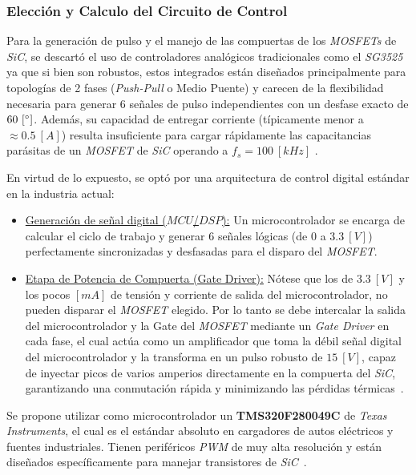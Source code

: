 \documentclass[12pt,a4paper]{article}
\begin{document}
\subsubsection{Elección y Calculo del Circuito de Control}                  \label{sec_2.3.1}
Para la generación de pulso y el manejo de las compuertas de los \textit{MOSFETs} de \textit{SiC}, se descartó el uso de controladores analógicos tradicionales como el \textit{SG3525} ya que si bien son robustos, estos integrados están diseñados principalmente para topologías de 2 fases (\textit{Push-Pull} o Medio Puente) y carecen de la flexibilidad necesaria para generar 6 señales de pulso independientes con un desfase exacto de $60 \ [\degree]$. Además, su capacidad de entregar corriente (típicamente menor a $\approx 0.5 \ [A]$) resulta insuficiente para cargar rápidamente las capacitancias parásitas de un \textit{MOSFET} de \textit{SiC} operando a $f_{s} = 100 \ [kHz]$ \cite{b16}.

En virtud de lo expuesto, se optó por una arquitectura de control digital estándar en la industria actual:
\begin{itemize}
    \item \underline{Generación de señal digital ($MCU$/$DSP$):} Un microcontrolador se encarga de calcular el ciclo de trabajo y generar 6 señales lógicas (de $0$ a $3.3 \ [V]$) perfectamente sincronizadas y desfasadas para el disparo del \textit{MOSFET}.
    
    \item \underline{Etapa de Potencia de Compuerta (Gate Driver):} Nótese que los de $3.3 \ [V]$ y los pocos $[mA]$ de tensión y corriente de salida del microcontrolador, no pueden disparar el \textit{MOSFET} elegido. Por lo tanto se debe intercalar la salida del microcontrolador y la Gate del \textit{MOSFET} mediante un \textit{Gate Driver} en cada fase, el cual actúa como un amplificador que toma la débil señal digital del microcontrolador y la transforma en un pulso robusto de $15 \ [V]$, capaz de inyectar picos de varios amperios directamente en la compuerta del \textit{SiC}, garantizando una conmutación rápida y minimizando las pérdidas térmicas~\cite{b17}.
\end{itemize}


Se propone utilizar como microcontrolador un \textbf{TMS320F280049C} de \textit{Texas Instruments}, el cual es el estándar absoluto en cargadores de autos eléctricos y fuentes industriales. Tienen periféricos \textit{PWM} de muy alta resolución y están diseñados específicamente para manejar transistores de \textit{SiC}~\cite{b18}.
\end{document}

